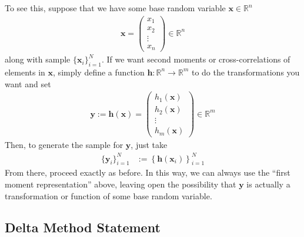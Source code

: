 \documentclass[12pt]{article}
\theoremstyle{plain}
\theoremstyle{definition}
\theoremstyle{remark}
\begin{document}
To see this, suppose that we have some base random variable
$\boldsymbol{x}\in\mathbb{R}^n$
\begin{align*}
  \boldsymbol{x} =
  \begin{pmatrix}
    x_1\\x_2\\\vdots\\x_n
  \end{pmatrix}
  \in \mathbb{R}^n
\end{align*}
along with sample $\{\boldsymbol{x}_i\}_{i=1}^N$. If we want second
moments or cross-correlations of elements in $\boldsymbol{x}$, simply
define a function $\boldsymbol{h}: \mathbb{R}^n \rightarrow
\mathbb{R}^m$ to do the transformations you want and set
\begin{align*}
  \boldsymbol{y}
  :=\boldsymbol{h}(\boldsymbol{x})
  =
  \begin{pmatrix}
    h_1(\boldsymbol{x})\\h_2(\boldsymbol{x})\\\vdots\\h_m(\boldsymbol{x})
  \end{pmatrix}
  \in\mathbb{R}^m
\end{align*}
Then, to generate the sample for $\boldsymbol{y}$, just take
\begin{align*}
  \{\boldsymbol{y}_i\}_{i=1}^N &:=
  \left\{\boldsymbol{h}\left(\boldsymbol{x}_i\right)\right\}_{i=1}^N
\end{align*}
From there, proceed exactly as before. In this way, we can always use
the ``first moment representation'' above, leaving open the possibility
that $\boldsymbol{y}$ is actually a transformation or function of some
base random variable.


\subsection{Delta Method Statement}
\end{document}
